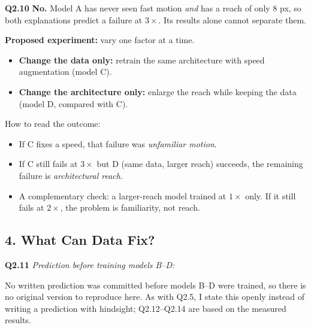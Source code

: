 \documentclass[11pt]{article}
\newcommand{\q}[1]{\par\medskip\noindent\textbf{#1}\quad}
\begin{document}
\q{Q2.10}
\textbf{No.} Model A has never seen fast motion \emph{and} has a reach of only 8 px, so both explanations predict a failure at $3\times$. Its results alone cannot separate them.

\textbf{Proposed experiment:} vary one factor at a time.
\begin{itemize}
  \item \textbf{Change the data only:} retrain the same architecture with speed augmentation (model C).
  \item \textbf{Change the architecture only:} enlarge the reach while keeping the data (model D, compared with C).
\end{itemize}
How to read the outcome:
\begin{itemize}
  \item If C fixes a speed, that failure was \emph{unfamiliar motion}.
  \item If C still fails at $3\times$ but D (same data, larger reach) succeeds, the remaining failure is \emph{architectural reach}.
  \item A complementary check: a larger-reach model trained at $1\times$ only. If it still fails at $2\times$, the problem is familiarity, not reach.
\end{itemize}

\subsection*{4. What Can Data Fix?}

\q{Q2.11} \emph{Prediction before training models B--D:}

No written prediction was committed before models B--D were trained, so there is no original version to reproduce here. As with Q2.5, I state this openly instead of writing a prediction with hindsight; Q2.12--Q2.14 are based on the measured results.
\end{document}
